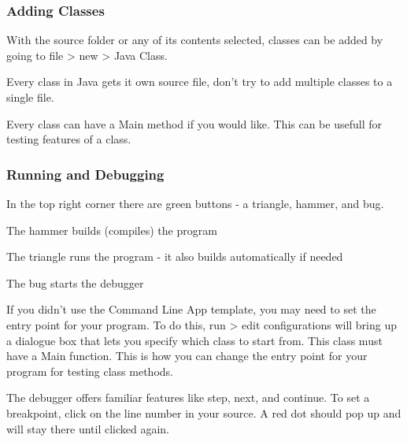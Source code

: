 \documentclass[../../main.tex]{subfiles}
\begin{document}
\subsubsection{Adding Classes}
\begin{steps}
   \item With the source folder or any of its contents selected, classes can be added by going to file > new > Java Class.
   \item Every class in Java gets it own source file, don't try to add multiple classes to a single file.
   \item Every class can have a Main method if you would like. This can be usefull for testing features of a class.
\end{steps}

\subsubsection{Running and Debugging}
In the top right corner there are green buttons - a triangle, hammer, and bug.
\begin{steps}
   \item The hammer builds (compiles) the program
   \item The triangle runs the program - it also builds automatically if needed
   \item The bug starts the debugger
   \item If you didn't use the Command Line App template, you may need to set the entry point for your program. To do this, run > edit
      configurations will bring up a dialogue box that lets you specify which class to start from. This class must have a Main function.
      This is how you can change the entry point for your program for testing class methods.
   \item The debugger offers familiar features like step, next, and continue. To set a breakpoint, click on the line number in your source.
      A red dot should pop up and will stay there until clicked again.
\end{steps}
\end{document}
